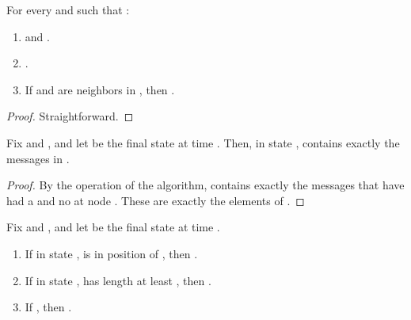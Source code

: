 \begin{lemma}

For every  and  such that :
  \begin{enumerate}
  \item  and .
  \label{item:lemma: t<t' => C(t) <= C(t')}

  \item .
  \label{item:lemma: C_i(t) subseteq R_i(t)}

  \item If  and  are neighbors in , then .
  \label{item:lemma: i and j neigh t'<=t C_i(t') subseteq R_j(t)}

  \end{enumerate}
\label{lemma:bmmb: C(t') subset C(t'')}
\label{lemma: CG1}
\label{lemma: CG4}
\end{lemma}
\begin{proof}
Straightforward.
\end{proof}



\begin{lemma}
\label{lemma: CG6}
Fix  and , and let  be the final state at time .
Then, in state ,  contains exactly the messages in .
\end{lemma}

\begin{proof}
By the operation of the algorithm,  contains exactly the
messages that have had a  and no  at node .
These
are exactly the elements of .
\end{proof}




\begin{lemma}
\label{lemma:  CG2}
\label{lemma: CG3}
Fix  and ,
and let  be the final state at time .
\begin{enumerate}
\item
If in state ,  is in position  of , then .
\item
If in state ,  has length at least , then
.
\item
If , then .
\end{enumerate}
\end{lemma}

